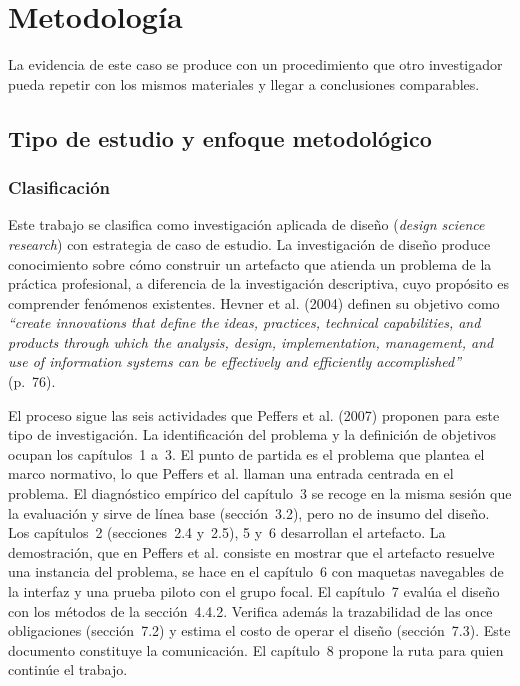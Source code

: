 \documentclass[12pt, a4paper]{article}
\makeatletter
\newcommand{\saltoseccion}{\par
  \ifx\@deferlist\@empty
    \ifdim\pagegoal<\maxdimen
      \ifdim\dimexpr\textheight-\pagegoal+\pagetotal\relax>0.5\textheight\clearpage\fi
    \fi
  \else\clearpage\fi}
\let\seccionbase\section
\renewcommand{\section}{\saltoseccion\seccionbase}
\makeatother
\begin{document}
\section{Metodología}
 
La evidencia de este caso se produce con un procedimiento que otro
investigador pueda repetir con los mismos materiales y llegar a
conclusiones comparables.
 
\subsection{Tipo de estudio y enfoque metodológico}
 
\subsubsection{Clasificación}
 
Este trabajo se clasifica como investigación aplicada de diseño
(\textit{design science research}) con estrategia de caso de estudio.
La investigación de diseño produce conocimiento sobre cómo construir un
artefacto que atienda un problema de la práctica profesional, a
diferencia de la investigación descriptiva, cuyo propósito es comprender
fenómenos existentes. Hevner et al. (2004) definen su objetivo como
\textit{``create innovations that define the ideas, practices, technical
capabilities, and products through which the analysis, design,
implementation, management, and use of information systems can be
effectively and efficiently accomplished''} (p.~76).
 
El proceso sigue las seis actividades que Peffers et al. (2007) proponen
para este tipo de investigación. La identificación del problema y la
definición de objetivos ocupan los capítulos~1 a~3. El punto de partida es el problema que plantea el marco normativo, lo que Peffers et al. llaman una entrada centrada en el problema. El diagnóstico
empírico del capítulo~3 se recoge en la misma sesión que la evaluación y
sirve de línea base (sección~3.2), pero no de insumo del diseño. Los
capítulos~2 (secciones~2.4 y~2.5), 5 y~6 desarrollan el artefacto. La
demostración, que en Peffers et al. consiste en mostrar que el artefacto
resuelve una instancia del problema, se hace en el capítulo~6 con
maquetas navegables de la interfaz y una prueba piloto con el grupo
focal. El capítulo~7 evalúa el diseño con
los métodos de
la sección~4.4.2. Verifica
además la trazabilidad de las once obligaciones (sección~7.2) y estima
el costo de operar el diseño (sección~7.3). Este documento constituye la
comunicación. El
capítulo~8 propone la ruta para quien continúe el trabajo.
 
\end{document}
